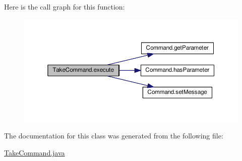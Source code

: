 Here is the call graph for this function\-:
\nopagebreak
\begin{figure}[H]
\begin{center}
\leavevmode
\includegraphics[width=350pt]{classTakeCommand_af316002e14bb3253d24bcb03282213ee_cgraph}
\end{center}
\end{figure}




The documentation for this class was generated from the following file\-:\begin{DoxyCompactItemize}
\item 
\hyperlink{TakeCommand_8java}{Take\-Command.\-java}\end{DoxyCompactItemize}
